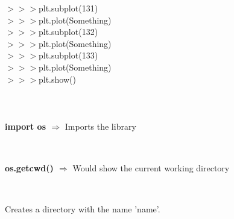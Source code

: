 \documentclass[a4paper,18pt]{article}
\begin{document}
$>>>$plt.subplot(131)\\

$>>>$plt.plot(Something)\\

$>>>$plt.subplot(132)\\

$>>>$plt.plot(Something)\\

$>>>$plt.subplot(133)\\

$>>>$plt.plot(Something)\\

$>>>$plt.show()\\\\


\newpage

\section{\colorbox {Abi}{}}

\subsection{\colorbox {matgreen}{\color{white}{\large import os}}}
\textbf{import os $\Rightarrow$} Imports the library\\\\


\subsection{\colorbox {matgreen}{\color{white}{\large os.getcwd()}}}
\textbf{os.getcwd() $\Rightarrow$} Would show the current working directory\\\\


\subsection{\colorbox {matgreen}{\color{white}{\large os.mkdir('name')}}}
Creates a directory with the name 'name'.\\\\
\end{document}
